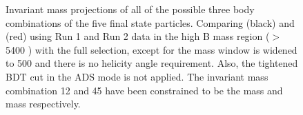 \begin{figure}
\hfill
{}
\caption{Invariant mass projections of all of the possible three body combinations of the five final state particles. Comparing \decay{\Dz}{\Km\pip} (black) and \decay{\Dz}{\Kp\pim} (red) using Run 1 and Run 2 data in the high B mass region ($>$ 5400 \mevcc) with the full selection, except for the \Kstar mass window is widened to 500 \mev and there is no \KS helicity angle requirement. Also, the tightened BDT cut in the ADS mode is not applied. The invariant mass combination 12 and 45 have been constrained to be the \Dz mass and \KS mass respectively.}
\label{projections3bodydtf}
\end{figure}

